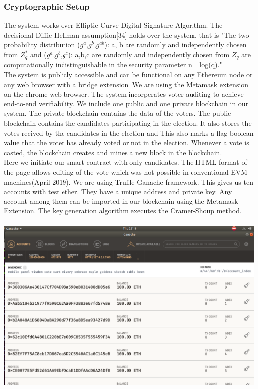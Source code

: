 \documentclass{article}
\begin{document}
\subsubsection{Cryptographic Setup} The system works over Elliptic Curve Digital Signature Algorithm. The decisional Diffie-Hellman assumption[34] holds over the system, that is "The two probability distribution {($g^a$,$g^b$,$g^{ab}$): a, b are randomly and independently chosen from $Z^*_q$} and {($g^a$,$g^b$,$g^c$): a,b,c are randomly and independently chosen from $Z_q$} are computationally indistinguishable in the security parameter n= log(q)."\\
The system is publicly accessible and can be functional on any  Ethereum node or any web browser with a bridge extension. We are using the Metamask extension on the chrome web browser. The system incorperates voter auditing to achieve end-to-end verifiability. We include one public and one private blockchain in our system. The private blockchain contains the data of the voters. The public blockchain contains the candidates participating in the election. It also stores the votes recived by the candidates in the election and  This also marks a flag boolean value that the voter has already voted or not in the election. Whenever a vote is casted, the blockchain creates and mines a new block in the blockchain.\\
Here we initiate our smart contract with only candidates. The HTML format of the page allows editing of the vote which was not possible in conventional EVM machines(April 2019). We are using Truffle Ganache framework. This gives us ten accounts with test ether. They have a unique address and private key. Any account among them can be imported in our blockchain using the Metamask Extension. The key generation algorithm executes the Cramer-Shoup method.
\\
\\
\includegraphics[scale=0.45]{ganache1.png}
\end{document}

